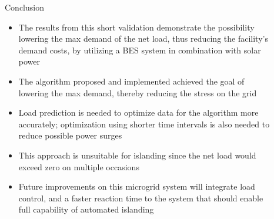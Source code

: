 \documentclass[final, 20 pt]{beamer}
\newlength{\sepwid}
\newlength{\onecolwid}
\newlength{\twocolwid}
\begin{document}
\begin{frame}[t]
\begin{columns}[t]
\begin{column}{\twocolwid}
\begin{columns}[t,totalwidth=\twocolwid]
\end{columns} %

\end{column} %

\begin{column}{\sepwid}\end{column} %

\begin{column}{\onecolwid} %


\begin{block}{Conclusion}

	\begin{itemize}	
		\item The results from this short validation demonstrate the possibility lowering the max demand of the net load, thus reducing the facility’s demand costs, by utilizing a BES system in combination with solar power
		\item The algorithm proposed and implemented achieved the goal of lowering the max demand, thereby reducing the stress on the grid
		\item Load prediction is needed to optimize data for the algorithm more accurately; optimization using shorter time intervals is also needed to reduce possible power surges
		\item This approach is unsuitable for islanding since the net load would exceed zero on multiple occasions
		\item Future improvements on this microgrid system will integrate load control, and a faster reaction time to the system that should enable full capability of automated islanding
	\end{itemize}

\end{block}


%
%


\end{column}
\end{columns}
\end{frame}
\end{document}
